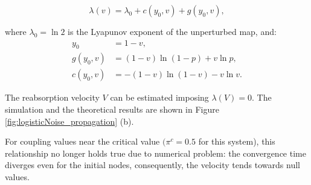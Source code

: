 \documentclass[runningheads]{llncs}
\begin{document}
\begin{equation}\label{eq:lambdaVdep}
    \lambda(v) = \lambda_0 + c(y_0, v) + g(y_0, v),
\end{equation}

where $\lambda_0 = \ln 2$ is the Lyapunov exponent of the unperturbed map, and:
\begin{equation}
    \begin{split}
        y_0 &= 1 - v, \\
        g(y_0, v) &= (1−v) \ln (1 − p) + v \ln p, \\
        c(y_0, v) &= −(1−v) \ln (1 − v) − v \ln v. 
    \end{split}
\end{equation}

The reabsorption velocity $V$ can be estimated imposing $\lambda(V) = 0$. The simulation and the theoretical results are shown in Figure \ref{fig:logisticNoise_propagation} (b). 


For coupling values near the critical value $(\pi^c = 0.5$ for this system), this relationship no longer holds true due to numerical problem: the convergence time diverges even for the initial nodes, consequently, the velocity tends towards null values.  

\end{document}

